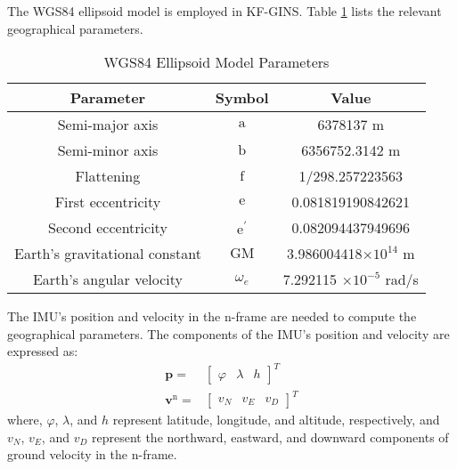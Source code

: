 \documentclass{article}
\begin{document}
The WGS84 ellipsoid model is employed in KF-GINS. Table \ref{tab:wgs84-parameters} lists the relevant geographical parameters.
\begin{table}[htbp]
    \centering
    \caption{WGS84 Ellipsoid Model Parameters}
    \label{tab:wgs84-parameters}
    \begin{tabular}{c c c}
        \toprule
        Parameter & Symbol & Value \\
        \midrule
        Semi-major axis & $\text{a}$ & 6378137 m \\
        Semi-minor axis & $\text{b}$ & 6356752.3142 m \\
        Flattening & $\text{f}$ & 1/298.257223563 \\
        First eccentricity & $\text{e}$ & 0.081819190842621 \\
        Second eccentricity & $\mathrm{e}^{'}$ &  0.082094437949696 \\
        Earth's gravitational constant & $\text{GM}$ & 3.986004418$\times 10^{14}$ m \\
        Earth's angular velocity & $\omega_{e}$ & 7.292115 $\times 10^{-5}$ rad/s \\
        \bottomrule
    \end{tabular}
\end{table}


The IMU's position and velocity in the $\mathrm{n}$-frame are needed to compute the geographical parameters. The components of the IMU's position and velocity are expressed as:
\begin{equation}
    \begin{aligned}
        \boldsymbol{p} =& \left[\begin{matrix} \varphi & \lambda & h \end{matrix}\right]^T \\
        \boldsymbol{v}^{\mathrm{n}} =& \left[\begin{matrix} v_{N} & v_{E} & v_{D}\end{matrix}\right]^T
    \end{aligned}
\end{equation}
where, $\varphi$, $\lambda$, and $h$ represent latitude, longitude, and altitude, respectively, and $v_{N}$, $v_{E}$, and $v_{D}$ represent the northward, eastward, and downward components of ground velocity in the $\mathrm{n}$-frame.
\end{document}
